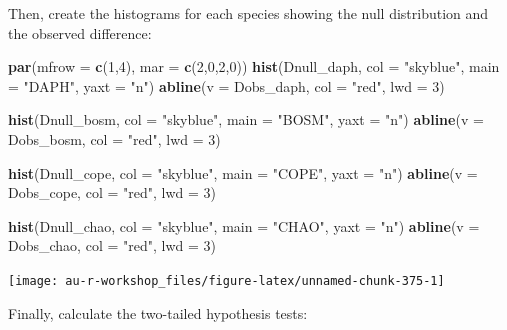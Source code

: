 \documentclass[]{book}
\newenvironment{Shaded}{\begin{snugshade}}{\end{snugshade}}
\newcommand{\KeywordTok}[1]{\textcolor[rgb]{0.13,0.29,0.53}{\textbf{#1}}}
\newcommand{\DataTypeTok}[1]{\textcolor[rgb]{0.13,0.29,0.53}{#1}}
\newcommand{\DecValTok}[1]{\textcolor[rgb]{0.00,0.00,0.81}{#1}}
\newcommand{\StringTok}[1]{\textcolor[rgb]{0.31,0.60,0.02}{#1}}
\newcommand{\NormalTok}[1]{#1}
\theoremstyle{definition}
\theoremstyle{definition}
\theoremstyle{definition}
\theoremstyle{remark}
\begin{document}
Then, create the histograms for each species showing the null
distribution and the observed difference:

\begin{Shaded}
\begin{Highlighting}[]
\KeywordTok{par}\NormalTok{(}\DataTypeTok{mfrow =} \KeywordTok{c}\NormalTok{(}\DecValTok{1}\NormalTok{,}\DecValTok{4}\NormalTok{), }\DataTypeTok{mar =} \KeywordTok{c}\NormalTok{(}\DecValTok{2}\NormalTok{,}\DecValTok{0}\NormalTok{,}\DecValTok{2}\NormalTok{,}\DecValTok{0}\NormalTok{))}
\KeywordTok{hist}\NormalTok{(Dnull_daph, }\DataTypeTok{col =} \StringTok{"skyblue"}\NormalTok{, }\DataTypeTok{main =} \StringTok{"DAPH"}\NormalTok{, }\DataTypeTok{yaxt =} \StringTok{"n"}\NormalTok{)}
\KeywordTok{abline}\NormalTok{(}\DataTypeTok{v =}\NormalTok{ Dobs_daph, }\DataTypeTok{col =} \StringTok{"red"}\NormalTok{, }\DataTypeTok{lwd =} \DecValTok{3}\NormalTok{)}

\KeywordTok{hist}\NormalTok{(Dnull_bosm, }\DataTypeTok{col =} \StringTok{"skyblue"}\NormalTok{, }\DataTypeTok{main =} \StringTok{"BOSM"}\NormalTok{, }\DataTypeTok{yaxt =} \StringTok{"n"}\NormalTok{)}
\KeywordTok{abline}\NormalTok{(}\DataTypeTok{v =}\NormalTok{ Dobs_bosm, }\DataTypeTok{col =} \StringTok{"red"}\NormalTok{, }\DataTypeTok{lwd =} \DecValTok{3}\NormalTok{)}

\KeywordTok{hist}\NormalTok{(Dnull_cope, }\DataTypeTok{col =} \StringTok{"skyblue"}\NormalTok{, }\DataTypeTok{main =} \StringTok{"COPE"}\NormalTok{, }\DataTypeTok{yaxt =} \StringTok{"n"}\NormalTok{)}
\KeywordTok{abline}\NormalTok{(}\DataTypeTok{v =}\NormalTok{ Dobs_cope, }\DataTypeTok{col =} \StringTok{"red"}\NormalTok{, }\DataTypeTok{lwd =} \DecValTok{3}\NormalTok{)}

\KeywordTok{hist}\NormalTok{(Dnull_chao, }\DataTypeTok{col =} \StringTok{"skyblue"}\NormalTok{, }\DataTypeTok{main =} \StringTok{"CHAO"}\NormalTok{, }\DataTypeTok{yaxt =} \StringTok{"n"}\NormalTok{)}
\KeywordTok{abline}\NormalTok{(}\DataTypeTok{v =}\NormalTok{ Dobs_chao, }\DataTypeTok{col =} \StringTok{"red"}\NormalTok{, }\DataTypeTok{lwd =} \DecValTok{3}\NormalTok{)}
\end{Highlighting}
\end{Shaded}

\begin{center}\texttt{[image: au-r-workshop\_files/figure-latex/unnamed-chunk-375-1]} \end{center}

Finally, calculate the two-tailed hypothesis tests:
\end{document}
